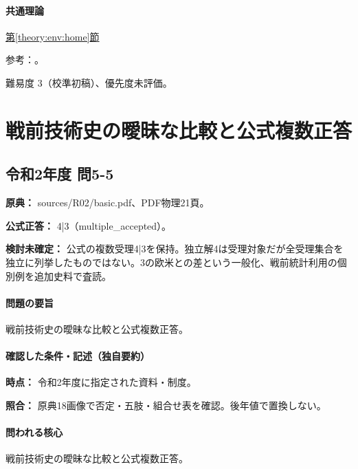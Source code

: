 \paragraph{共通理論} \hyperref[theory:env:home]{第\ref*{theory:env:home}節}

\par 参考：\cite{env59_energy2019}。

\par 難易度 3（校準初稿）、優先度未評価。

\section{戦前技術史の曖昧な比較と公式複数正答}

\subsection{令和2年度 問5-5}
\label{q:r02-reg-basic-5-5}

\noindent\textbf{原典：} sources/R02/basic.pdf、PDF物理21頁。

\textbf{公式正答：} 4|3（multiple\_accepted）。

\par\textbf{検討未確定：} 公式の複数受理4|3を保持。独立解4は受理対象だが全受理集合を独立に列挙したものではない。3の欧米との差という一般化、戦前統計利用の個別例を追加史料で査読。

\paragraph{問題の要旨} 戦前技術史の曖昧な比較と公式複数正答。

\paragraph{確認した条件・記述（独自要約）}\mbox{}\par

\noindent\textbf{時点：} 令和2年度に指定された資料・制度。\par

\noindent\textbf{照合：} 原典18画像で否定・五肢・組合せ表を確認。後年値で置換しない。\par

\paragraph{問われる核心} 戦前技術史の曖昧な比較と公式複数正答。

